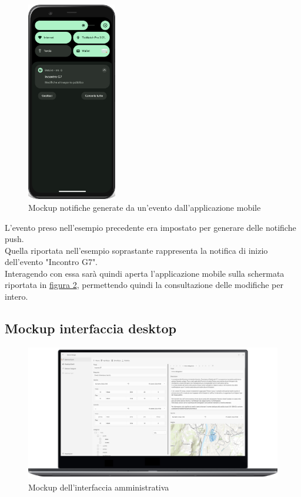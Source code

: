 \documentclass{article}
\begin{document}
\begin{figure}[htbp]
    \label{4.1.3}
    \centering
    \includegraphics[width=0.35\textwidth]{Images/Mockup3 - Mobile.png}
    \caption{Mockup notifiche generate da un'evento dall'applicazione mobile}
\end{figure}

L'evento preso nell'esempio precedente era impostato per generare delle notifiche push.\\
Quella riportata nell'esempio soprastante rappresenta la notifica di inizio dell'evento "Incontro G7".\\
Interagendo con essa sarà quindi aperta l'applicazione mobile sulla schermata riportata in \hyperref[fig:Dettaglio_evento]{figura 2}, permettendo quindi la consultazione delle modifiche per intero.\\

\clearpage

\subsection{Mockup interfaccia desktop}
\begin{figure}[htbp]
    \label{4.2}
    \centering
    \includegraphics[width=1\textwidth]{Images/Mockup1 - Desktop.png}
    \caption{Mockup dell'interfaccia amministrativa}
\end{figure}
\end{document}

